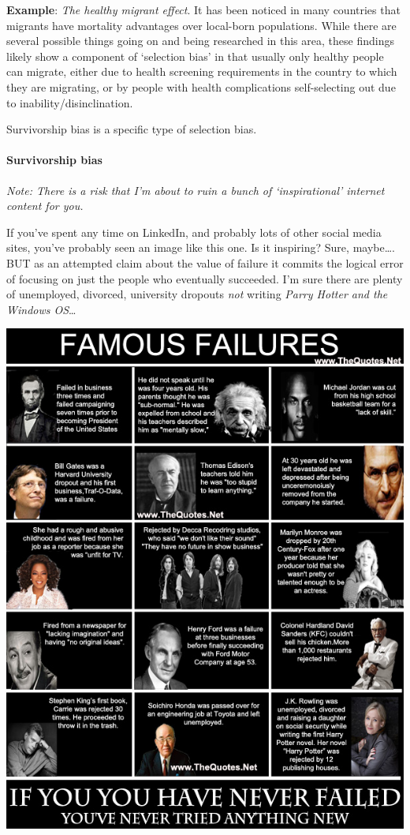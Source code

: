 \documentclass[
  openany]{book}
\begin{document}
\textbf{Example}: \emph{The healthy migrant effect}. It has been noticed in many countries that migrants have mortality advantages over local-born populations. While there are several possible things going on and being researched in this area, these findings likely show a component of `selection bias' in that usually only healthy people can migrate, either due to health screening requirements in the country to which they are migrating, or by people with health complications self-selecting out due to inability/disinclination.

Survivorship bias is a specific type of selection bias.

\hypertarget{survivorship-bias}{%
\paragraph{Survivorship bias}\label{survivorship-bias}}

\emph{Note: There is a risk that I'm about to ruin a bunch of `inspirational' internet content for you.}

If you've spent any time on LinkedIn, and probably lots of other social media sites, you've probably seen an image like this one. Is it inspiring? Sure, maybe\ldots. BUT as an attempted claim about the value of failure it commits the logical error of focusing on just the people who eventually succeeded. I'm sure there are plenty of unemployed, divorced, university dropouts \emph{not} writing \emph{Parry Hotter and the Windows OS}\ldots{}

\begin{center}\includegraphics[width=0.65\linewidth]{images/m2/failures} \end{center}
\end{document}
